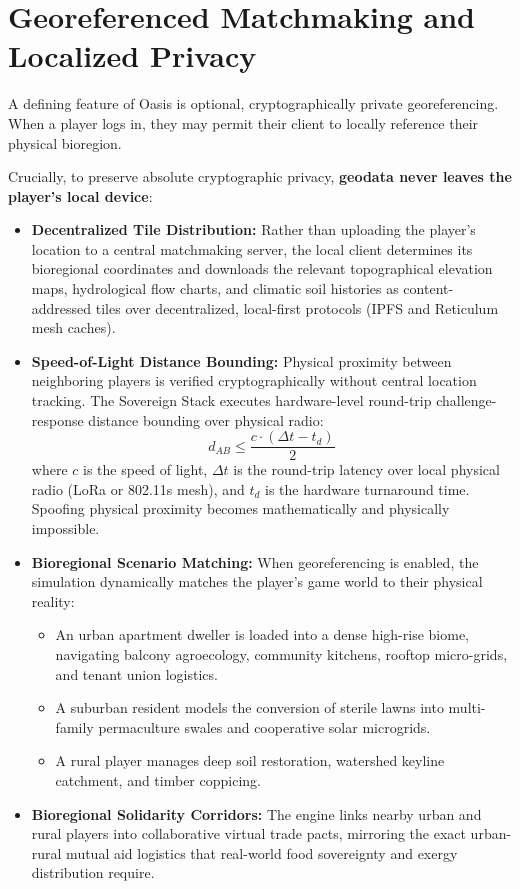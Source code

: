 \section{Georeferenced Matchmaking and Localized Privacy}

A defining feature of Oasis is optional, cryptographically private georeferencing. When a player logs in, they may permit their client to locally reference their physical bioregion. 

Crucially, to preserve absolute cryptographic privacy, \textbf{geodata never leaves the player's local device}:
\begin{itemize}
    \item \textbf{Decentralized Tile Distribution:} Rather than uploading the player's location to a central matchmaking server, the local client determines its bioregional coordinates and downloads the relevant topographical elevation maps, hydrological flow charts, and climatic soil histories as content-addressed tiles over decentralized, local-first protocols (IPFS and Reticulum mesh caches).
    \item \textbf{Speed-of-Light Distance Bounding:} Physical proximity between neighboring players is verified cryptographically without central location tracking. The Sovereign Stack executes hardware-level round-trip challenge-response distance bounding over physical radio:
    \begin{equation}
        d_{AB} \le \frac{c \cdot (\Delta t - t_d)}{2}
    \end{equation}
    where $c$ is the speed of light, $\Delta t$ is the round-trip latency over local physical radio (LoRa or 802.11s mesh), and $t_d$ is the hardware turnaround time. Spoofing physical proximity becomes mathematically and physically impossible.
    \item \textbf{Bioregional Scenario Matching:} When georeferencing is enabled, the simulation dynamically matches the player's game world to their physical reality:
    \begin{itemize}
        \item An urban apartment dweller is loaded into a dense high-rise biome, navigating balcony agroecology, community kitchens, rooftop micro-grids, and tenant union logistics.
        \item A suburban resident models the conversion of sterile lawns into multi-family permaculture swales and cooperative solar microgrids.
        \item A rural player manages deep soil restoration, watershed keyline catchment, and timber coppicing.
    \end{itemize}
    \item \textbf{Bioregional Solidarity Corridors:} The engine links nearby urban and rural players into collaborative virtual trade pacts, mirroring the exact urban-rural mutual aid logistics that real-world food sovereignty and exergy distribution require.
\end{itemize}

